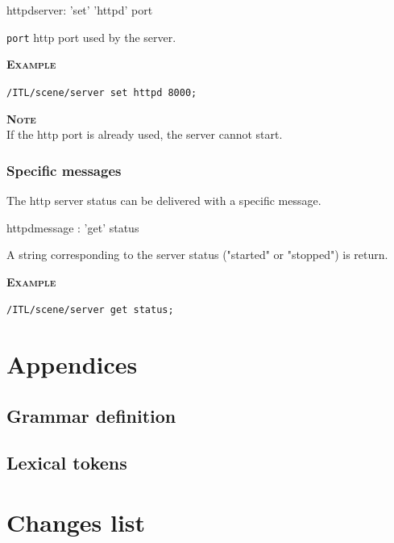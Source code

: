 \documentclass[a4paper,twoside]{report}
\newcommand{\toplevel}[1]	{\chapter{#1}}
\newcommand{\sublevel}[1]	{\section{#1}}
\newcommand{\subsublevel}[1]	{\subsection{#1}}
\newcommand{\OSC}[1]		{\texttt{#1}}
\newcommand{\example}		{\textbf{\hspace{-1.5cm}\textbf{\textsc{Example }}}}
\newcommand{\note}	[1]		{\vspace{2mm}\textbf{\hspace{-1.03cm}\textbf{\textsc{Note #1}}}}
\let\olditemize\itemize
\let\oldenditemize\enditemize
\renewenvironment{itemize} 	{\olditemize \setlength{\itemsep}{1mm}}{\oldenditemize}
\newcommand{\sample}	[1]			{\vspace{-2mm}\begin{center}\colorbox{mygrey}{
								\begin{minipage}[t]{0.9\columnwidth} 
								{\small \texttt{#1}}
								\end{minipage}}\end{center}}
\begin{document}
\begin{rail}
httpdserver: 'set' 'httpd' port
\end{rail}

\begin{itemize}
\item \OSC{port} http port used by the server.
\end{itemize}

\example \\
\sample{/ITL/scene/server set httpd 8000;}

\note{} \\
If the http port is already used, the server cannot start.

\subsublevel{Specific messages}
\label{httpdmsg}
The http server status can be delivered with a specific message.

\begin{rail}
httpdmessage : 'get' status
\end{rail}


A string corresponding to the server status ("started" or "stopped") is return.

\example \\
\sample{/ITL/scene/server get status;}

\toplevel{Appendices}
\sublevel{Grammar definition}
\label{yacc}


\sublevel{Lexical tokens}
\label{lex}



\toplevel{ Changes list}
\label{changes}



\printindex
\end{document}
